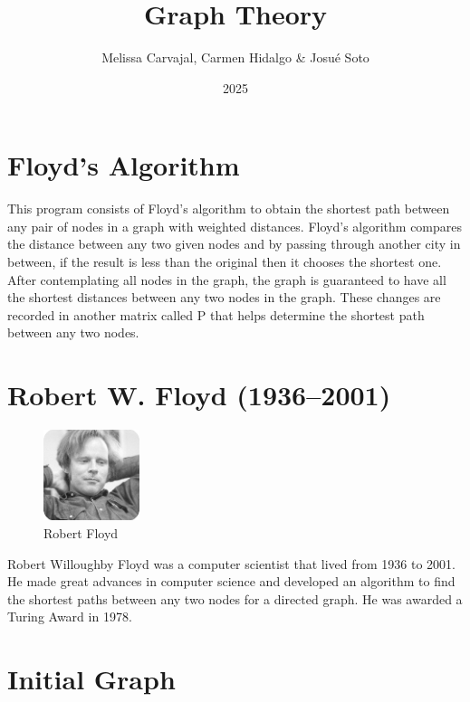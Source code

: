 \documentclass{article}
\begin{document}
\title{Graph Theory}
\author{Melissa Carvajal, Carmen Hidalgo \& Josu\'e Soto}
\date{2025}


\maketitle

\section{Floyd's Algorithm}
This program consists of Floyd's algorithm to obtain the shortest path between any pair of nodes in a graph with weighted distances.
Floyd's algorithm compares the distance between any two given nodes and by passing through another city in between, if the result is less than the original then it chooses the shortest one. After contemplating all nodes in the graph, the graph is guaranteed to have all the shortest distances between any two nodes in the graph. These changes are recorded in another matrix called P that helps determine the shortest path between any two nodes.
\section{Robert W. Floyd (1936–2001)}
\begin{figure}

\includegraphics[width=0.25\textwidth]{floyd.jpg}
\caption{\label{fig:floyd}Robert Floyd}
\end{figure}
Robert Willoughby Floyd was a computer scientist that lived from 1936 to 2001. He made great advances in computer science and developed an algorithm to find the shortest paths between any two nodes for a directed graph. He was awarded a Turing Award in 1978.
\section{Initial Graph}
\begin{center}
\end{center}
\end{document}
